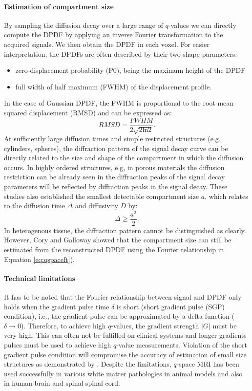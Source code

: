 \paragraph*{Estimation of compartment size}
By sampling the diffusion decay over a large range of $q$-values we can directly compute the DPDF by applying an inverse Fourier transformation to the acquired signals. We then obtain the DPDF in each voxel. For easier interpretation, the DPDFs are often described by their two shape parameters:
\begin{itemize}
	\item zero-displacement probability (P0), being the maximum height of the DPDF
	\item full width of half maximum (FWHM) of the displacement profile.
\end{itemize}
In the case of Gaussian DPDF, the FWHM is proportional to the root mean squared displacement (RMSD)\cite{cory90} and can be expressed as:
\begin{equation}
	RMSD = \frac{FWHM}{2\sqrt{2\mbox{ln}2}}.
\end{equation}
At sufficiently large diffusion times and simple restricted structures (e.g. cylinders, spheres), the diffraction pattern of the signal decay curve can be directly related to the size and shape of the compartment in which the diffusion occurs. In highly ordered structures, e.g, in porous materials the diffusion restriction can be already seen in the diffraction peaks of the signal decay \cite{TODO} parameters will be reflected by diffraction peaks in the signal decay. These studies also established the smallest detectable compartment size $a$, which relates to the diffusion time $\Delta$ and diffusivity $D$ by:
\begin{equation}
	\Delta \ge \frac{a^2}{2}.
\end{equation}   
In heterogenous tissue, the diffraction pattern cannot be distinguished as clearly. However, Cory and Galloway\cite{cory90} showed that the compartment size can still be estimated from the reconstructed DPDF using the Fourier relationship in Equation \ref{eq:qspaceft}). 
\paragraph*{Technical limitations}
It has to be noted that the Fourier relationship between signal and DPDF only holds when the gradient pulse time $\delta$ is short (short gradient pulse (SGP) condition), i.e., the gradient pulse can be approximated by a delta function ($\delta\rightarrow 0$). Therefore, to achieve high $q$-values, the gradient strength $|G|$ must be very high. This can often not be fulfilled on clinical systems and longer gradients pulses must be used to achieve high $q$-value measurements. Violation of the short gradient pulse condition will compromise the accuracy of estimation of small size structures as demonstrated by \cite{laett07,TODO}. Despite the limitations, $q$-space MRI has been used successfully in various white matter pathologies in animal models \cite{TODO} and also in human brain \cite{TODO} and spinal spinal cord\cite{TODO}.

